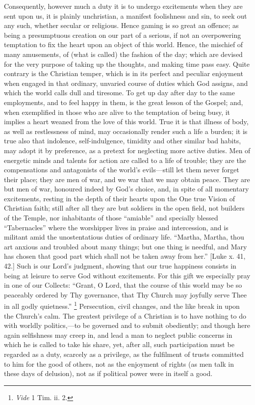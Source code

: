 Consequently, however much a duty it is to undergo excitements when
they are sent upon us, it is plainly unchristian, a manifest foolishness
and sin, to seek out any such, whether secular or religious. Hence
gaming is so great an offence; as being a presumptuous creation on our
part of a serious, if not an overpowering temptation to fix the heart
upon an object of this world. Hence, the mischief of many amusements, of
(what is called) the fashion of the day; which are devised for the very
purpose of taking up the thoughts, and making time pass easy. Quite
contrary is the Christian temper, which is in its perfect and peculiar
enjoyment when engaged in that ordinary, unvaried course of duties which
God assigns, and which the world calls dull and tiresome. To get up day
after day to the same employments, and to feel happy in them, is the
great lesson of the Gospel; and, when exemplified in those who are alive
to the temptation of being busy, it implies a heart weaned from the love
of this world. True it is that illness of body, as well as restlessness
of mind, may occasionally render such a life a burden; it is true also
that indolence, self-indulgence, timidity and other similar bad habits,
may adopt it by preference, as a pretext for neglecting more active
duties. Men of energetic minds and talents for action are called to a
life of trouble; they are the compensations and antagonists of the
world's evils—still let them never forget their place; they are men of
war, and we war that we may obtain peace. They are but men of war,
honoured indeed by God's choice, and, in spite of all momentary
excitements, resting in the depth of their hearts upon the One true
Vision of Christian faith; still after all they are but soldiers in the
open field, not builders of the Temple, nor inhabitants of those
``amiable'' and specially blessed ``Tabernacles'' where
the worshipper lives in praise and intercession, and is militant amid
the unostentatious duties of ordinary life. ``Martha, Martha, thou
art anxious and troubled about many things; but one thing is needful,
and Mary has chosen that good part which shall not be taken away from
her.'' [Luke x. 41, 42.] Such is our Lord's judgment, showing that
our true happiness consists in being at leisure to serve God without
excitements. For this gift we especially pray in one of our Collects:
``Grant, O Lord, that the course of this world may be so peaceably
ordered by Thy governance, that Thy Church may joyfully serve Thee in
all godly quietness.'' \footnote{\emph{Vide} 1 Tim. ii. 2.}
Persecution, civil changes, and the like break in upon the Church's
calm. The greatest privilege of a Christian is to have nothing to do
with worldly politics,—to be governed and to submit obediently; and
though here again selfishness may creep in, and lead a man to neglect
public concerns in which he is called to take his share, yet, after all,
such participation must be regarded as a duty, scarcely as a privilege,
as the fulfilment of trusts committed to him for the good of others, not
as the enjoyment of rights (as men talk in these days of delusion), not
as if political power were in itself a good.

